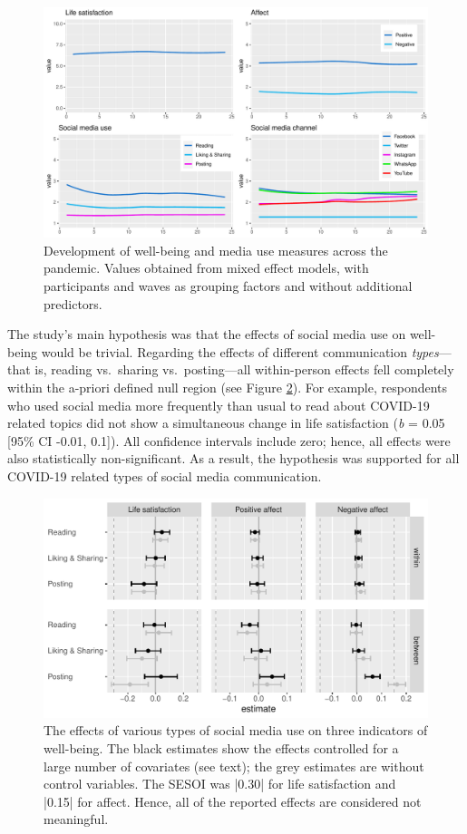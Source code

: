 \documentclass[
  english,
  man,mask,floatsintext]{apa6}
\begin{document}
\begin{figure}
\includegraphics[width=\textwidth]{figures/fig_descriptives} \caption{Development of well-being and media use measures across the pandemic. Values obtained from mixed effect models, with participants and waves as grouping factors and without additional predictors.}\label{fig:fig-desc}
\end{figure}

The study's main hypothesis was that the effects of social media use on well-being would be trivial.
Regarding the effects of different communication \emph{types}---that is, reading vs.~sharing vs.~posting---all within-person effects fell completely within the a-priori defined null region (see Figure \ref{fig:res-activity}).
For example, respondents who used social media more frequently than usual to read about COVID-19 related topics did not show a simultaneous change in life satisfaction (\emph{b} = 0.05 {[}95\% CI -0.01, 0.1{]}).
All confidence intervals include zero; hence, all effects were also statistically non-significant.
As a result, the hypothesis was supported for all COVID-19 related types of social media communication.

\begin{figure}
\includegraphics[width=\textwidth]{figures/fig_results_activity} \caption{The effects of various types of social media use on three indicators of well-being. The black estimates show the effects controlled for a large number of covariates (see text); the grey estimates are without control variables. The SESOI was |0.30| for life satisfaction and |0.15| for affect. Hence, all of the reported effects are considered not meaningful.}\label{fig:res-activity}
\end{figure}
\end{document}
